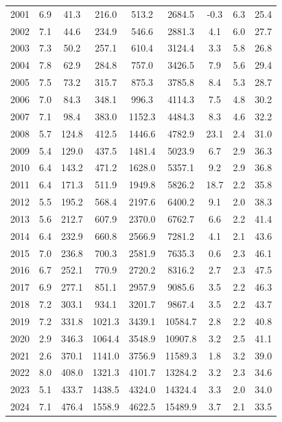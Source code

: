 \documentclass{article}
\begin{document}
\begin{table}[h]
{\begin{tabular}{|c|c|c|c|c|c|c|c|c|}
        2001 & 6.9 & 41.3 & 216.0 & 513.2 & 2684.5 & -0.3 & 6.3 & 25.4 \\
        2002 & 7.1 & 44.6 & 234.9 & 546.6 & 2881.3 & 4.1 & 6.0 & 27.7 \\
        2003 & 7.3 & 50.2 & 257.1 & 610.4 & 3124.4 & 3.3 & 5.8 & 26.8 \\
        2004 & 7.8 & 62.9 & 284.8 & 757.0 & 3426.5 & 7.9 & 5.6 & 29.4 \\
        2005 & 7.5 & 73.2 & 315.7 & 875.3 & 3785.8 & 8.4 & 5.3 & 28.7 \\
        2006 & 7.0 & 84.3 & 348.1 & 996.3 & 4114.3 & 7.5 & 4.8 & 30.2 \\
        2007 & 7.1 & 98.4 & 383.0 & 1152.3 & 4484.3 & 8.3 & 4.6 & 32.2 \\
        2008 & 5.7 & 124.8 & 412.5 & 1446.6 & 4782.9 & 23.1 & 2.4 & 31.0 \\
        2009 & 5.4 & 129.0 & 437.5 & 1481.4 & 5023.9 & 6.7 & 2.9 & 36.3 \\
        2010 & 6.4 & 143.2 & 471.2 & 1628.0 & 5357.1 & 9.2 & 2.9 & 36.8 \\
        2011 & 6.4 & 171.3 & 511.9 & 1949.8 & 5826.2 & 18.7 & 2.2 & 35.8 \\
        2012 & 5.5 & 195.2 & 568.4 & 2197.6 & 6400.2 & 9.1 & 2.0 & 38.3 \\
        2013 & 5.6 & 212.7 & 607.9 & 2370.0 & 6762.7 & 6.6 & 2.2 & 41.4 \\
        2014 & 6.4 & 232.9 & 660.8 & 2566.9 & 7281.2 & 4.1 & 2.1 & 43.6 \\
        2015 & 7.0 & 236.8 & 700.3 & 2581.9 & 7635.3 & 0.6 & 2.3 & 46.1 \\
        2016 & 6.7 & 252.1 & 770.9 & 2720.2 & 8316.2 & 2.7 & 2.3 & 47.5 \\
        2017 & 6.9 & 277.1 & 851.1 & 2957.9 & 9085.6 & 3.5 & 2.2 & 46.3 \\
        2018 & 7.2 & 303.1 & 934.1 & 3201.7 & 9867.4 & 3.5 & 2.2 & 43.7 \\
        2019 & 7.2 & 331.8 & 1021.3 & 3439.1 & 10584.7 & 2.8 & 2.2 & 40.8 \\
        2020 & 2.9 & 346.3 & 1064.4 & 3548.9 & 10907.8 & 3.2 & 2.5 & 41.1 \\
        2021 & 2.6 & 370.1 & 1141.0 & 3756.9 & 11589.3 & 1.8 & 3.2 & 39.0 \\
        2022 & 8.0 & 408.0 & 1321.3 & 4101.7 & 13284.2 & 3.2 & 2.3 & 34.6 \\
        2023 & 5.1 & 433.7 & 1438.5 & 4324.0 & 14324.4 & 3.3 & 2.0 & 34.0 \\
        2024 & 7.1 & 476.4 & 1558.9 & 4622.5 & 15489.9 & 3.7 & 2.1 & 33.5 \\
        \hline
    \end{tabular}
    }
\end{table}
\clearpage
\end{document}
